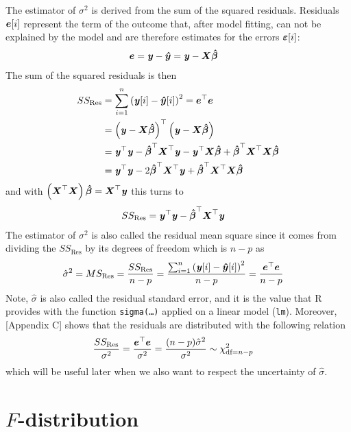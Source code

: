 \documentclass[11pt,a4paper,twoside]{book}\usepackage[]{graphicx}\usepackage[]{xcolor}
\begin{document}
The estimator of $\sigma^2$ is derived from the sum of the squared residuals. Residuals ${\boldsymbol{e}}[i]$ represent the term of the outcome that, after model fitting, can not be explained by the model and are therefore estimates for the errors ${\boldsymbol{\varepsilon}}[i]$:
\begin{align*}
{\boldsymbol{e}}&={\textbf{\textit{y}}}-{\boldsymbol{\hat{y}}}={\textbf{\textit{y}}}-{\boldsymbol{X}}{\boldsymbol{\hat\beta}}
\end{align*}
The sum of the squared residuals is then
\begin{align*}
SS_\text{Res}&=\sum_{i=1}^{n}\left({\textbf{\textit{y}}}[i]-{\boldsymbol{\hat{y}}}[i]\right)^2={\boldsymbol{e}}^\top{\boldsymbol{e}}\\
&=\left({\textbf{\textit{y}}}-{\boldsymbol{X}}{\boldsymbol{\hat\beta}}\right)^\top \left({\textbf{\textit{y}}}-{\boldsymbol{X}}{\boldsymbol{\hat\beta}}\right)\\
&={\textbf{\textit{y}}}^\top {\textbf{\textit{y}}}-{\boldsymbol{\hat\beta}}^\top {\boldsymbol{X}}^\top {\textbf{\textit{y}}}-{\textbf{\textit{y}}}^\top {\boldsymbol{X}} {\boldsymbol{\hat\beta}}+{\boldsymbol{\hat\beta}}^\top {\boldsymbol{X}}^\top {\boldsymbol{X}} {\boldsymbol{\hat\beta}}\\
&={\textbf{\textit{y}}}^\top{\textbf{\textit{y}}}-2{\boldsymbol{\hat\beta}}^\top{\boldsymbol{X}}^\top{\textbf{\textit{y}}}+{\boldsymbol{\hat\beta}}^\top {\boldsymbol{X}}^\top {\boldsymbol{X}} {\boldsymbol{\hat\beta}}
\end{align*}
and with $\left({\boldsymbol{X}}^\top {\boldsymbol{X}}\right){\boldsymbol{\hat\beta}}={\boldsymbol{X}}^\top {\textbf{\textit{y}}}$ this turns to 
\begin{align*}
SS_\text{Res}&={\textbf{\textit{y}}}^\top{\textbf{\textit{y}}}-{\boldsymbol{\hat\beta}}^\top {\boldsymbol{X}}^\top {\textbf{\textit{y}}}
\end{align*}
The estimator of $\sigma^2$ is also called the residual mean square since it comes from dividing the $SS_\text{Res}$ by its degrees of freedom which is $n-p$ as
\begin{align*}
\hat\sigma^2&=MS_\text{Res}=\frac{SS_\text{Res}}{n-p}=\frac{\sum_{i=1}^{n}\left({\textbf{\textit{y}}}[i]-{\boldsymbol{\hat{y}}}[i]\right)^2}{n-p}=\frac{{\boldsymbol{e}}^\top{\boldsymbol{e}}}{n-p}
\end{align*}
Note, $\hat\sigma$ is also called the residual standard error, and it is the value that \textsf{R} provides with the function \texttt{sigma(\dots)} applied on a linear model (\texttt{lm}).
Moreover, \cite{montgomery}[Appendix C] shows that the residuals are distributed with the  following relation
\begin{align}
\frac{SS_\text{Res}}{\sigma^2}=\frac{{\boldsymbol{e}}^\top{\boldsymbol{e}}}{\sigma^2}=\frac{(n-p)\hat{\sigma}^2}{\sigma^2}&\sim\chi^2_{\text{df=}n-p}\label{eq:sigma_dist}
\end{align}
which will be useful later when we also want to respect the uncertainty of $\hat\sigma$.




\section{$F$-distribution}
\end{document}
